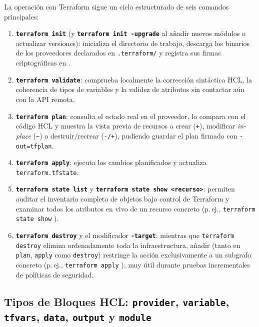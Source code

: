 La operación con Terraform sigue un ciclo estructurado de seis comandos principales:
\begin{enumerate}
  \item \textbf{\texttt{terraform init}} (y \textbf{\texttt{terraform init -upgrade}} al añadir nuevos módulos o actualizar versiones): inicializa el directorio de trabajo, descarga los binarios de los proveedores declarados en \texttt{.terraform/} y registra sus firmas criptográficas en .
  \item \textbf{\texttt{terraform validate}}: comprueba localmente la corrección sintáctica HCL, la coherencia de tipos de variables y la validez de atributos sin contactar aún con la API remota.
  \item \textbf{\texttt{terraform plan}}: consulta el estado real en el proveedor, lo compara con el código HCL y muestra la vista previa de recursos a crear (\texttt{+}), modificar \textit{in-place} (\texttt{\textasciitilde}) o destruir/recrear (\texttt{-/+}), pudiendo guardar el plan firmado con \texttt{-out=tfplan}.
  \item \textbf{\texttt{terraform apply}}: ejecuta los cambios planificados y actualiza \texttt{terraform.tfstate}.
  \item \textbf{\texttt{terraform state list}} y \textbf{\texttt{terraform state show <recurso>}}: permiten auditar el inventario completo de objetos bajo control de Terraform y examinar todos los atributos en vivo de un recurso concreto (p.\,ej., \texttt{terraform state show} ).
  \item \textbf{\texttt{terraform destroy}} y el modificador \textbf{\texttt{-target}}: mientras que \texttt{terraform destroy} elimina ordenadamente toda la infraestructura, añadir  (tanto en \texttt{plan}, \texttt{apply} como \texttt{destroy}) restringe la acción exclusivamente a un subgrafo concreto (p.\,ej., \texttt{terraform apply} ), muy útil durante pruebas incrementales de políticas de seguridad.
\end{enumerate}

\subsection{Tipos de Bloques HCL: \texttt{provider}, \texttt{variable}, \texttt{tfvars}, \texttt{data}, \texttt{output} y \texttt{module}}

